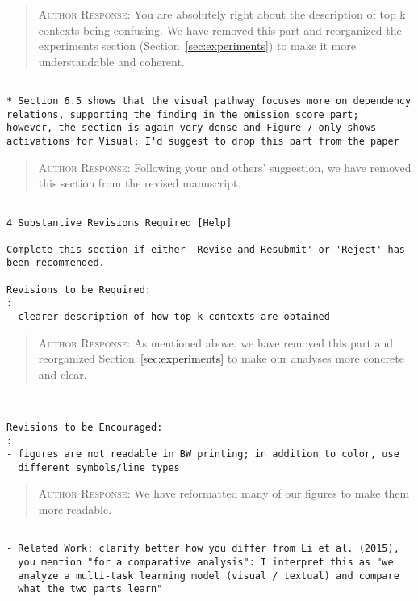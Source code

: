 \begin{quote}
\textsc{Author Response:}  You are absolutely right about the description of 
top k contexts being confusing. We have removed this part and reorganized 
the experiments section (Section~\ref{sec:experiments}) to make it more understandable
and coherent. 
\end{quote}
\begin{verbatim}

* Section 6.5 shows that the visual pathway focuses more on dependency
relations, supporting the finding in the omission score part;
however, the section is again very dense and Figure 7 only shows
activations for Visual; I'd suggest to drop this part from the paper

\end{verbatim}  
\begin{quote}
\textsc{Author Response:}  Following your and others' suggestion, we have removed this section from the revised manuscript.
\end{quote}
\begin{verbatim}

4 Substantive Revisions Required [Help]

Complete this section if either 'Revise and Resubmit' or 'Reject' has
been recommended.

Revisions to be Required:
: 
- clearer description of how top k contexts are obtained
\end{verbatim}  
\begin{quote}
\textsc{Author Response:}  As mentioned above, we have removed this part and reorganized Section~\ref{sec:experiments} to make our analyses more concrete and clear.
\end{quote}
\begin{verbatim}


Revisions to be Encouraged:
: 
- figures are not readable in BW printing; in addition to color, use
  different symbols/line types
\end{verbatim}  
\begin{quote}
\textsc{Author Response:}  We have reformatted many of our figures to make them more readable.
\end{quote}
\begin{verbatim}

- Related Work: clarify better how you differ from Li et al. (2015),
  you mention "for a comparative analysis": I interpret this as "we
  analyze a multi-task learning model (visual / textual) and compare
  what the two parts learn"
\end{verbatim}  
